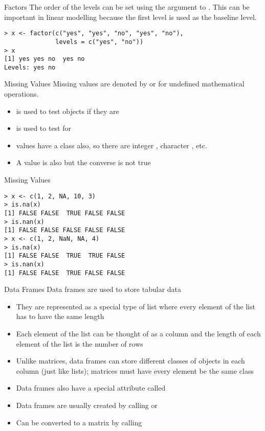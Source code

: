 \documentclass[aspectratio=169]{beamer}
\begin{document}
\begin{frame}[fragile]{Factors}
The order of the levels can be set using the  argument to
.  This can be important in linear modelling because
the first level is used as the baseline level.
\begin{verbatim}
> x <- factor(c("yes", "yes", "no", "yes", "no"), 
              levels = c("yes", "no"))
> x
[1] yes yes no  yes no 
Levels: yes no
\end{verbatim}
\end{frame}

\begin{frame}[fragile]{Missing Values}
Missing values are denoted by  or  for undefined
mathematical operations.
\begin{itemize}
\item
{} is used to test objects if they are 
\item
{} is used to test for 
\item
{} values have a class also, so there are integer ,
character , etc.  
\item
A  value is also  but the converse is not true
\end{itemize}
\end{frame}

\begin{frame}[fragile]{Missing Values}
\begin{verbatim}
> x <- c(1, 2, NA, 10, 3)
> is.na(x)
[1] FALSE FALSE  TRUE FALSE FALSE
> is.nan(x)
[1] FALSE FALSE FALSE FALSE FALSE
> x <- c(1, 2, NaN, NA, 4)
> is.na(x)
[1] FALSE FALSE  TRUE  TRUE FALSE
> is.nan(x)
[1] FALSE FALSE  TRUE FALSE FALSE
\end{verbatim}
\end{frame}

\begin{frame}{Data Frames}
Data frames are used to store tabular data
\begin{itemize}
\item
They are represented as a special type of list where every element of
the list has to have the same length
\item
Each element of the list can be thought of as a column and the length
of each element of the list is the number of rows
\item
Unlike matrices, data frames can store different classes of objects in
each column (just like lists); matrices must have every element be the
same class
\item
Data frames also have a special attribute called 
\item
Data frames are usually created by calling  or
\item
Can be converted to a matrix by calling 
\end{itemize}
\end{frame}
\end{document}
